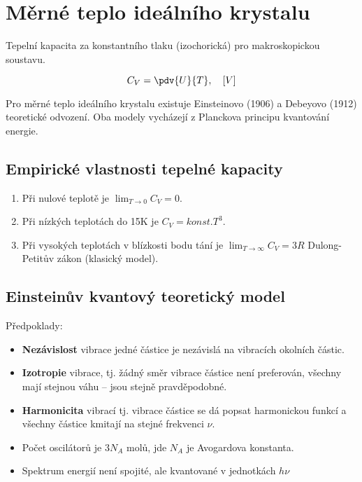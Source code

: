\chapter{Měrné teplo ideálního krystalu}

Tepelní kapacita za konstantního tlaku (izochorická) pro makroskopickou soustavu.

\begin{equation}
    C_V = \pdv{U}{T}, \quad [V]
\end{equation}

Pro měrné teplo ideálního krystalu existuje Einsteinovo (1906) a Debeyovo (1912) teoretické odvození. Oba modely vycházejí z Planckova principu kvantování energie.  

\section{Empirické vlastnosti tepelné kapacity}

\begin{enumerate}
    \item Při nulové teplotě je $\lim_{T \to 0} C_V = 0$.
    \item Při nízkých teplotách do 15K je $C_V = konst. T^3$.
    \item Při vysokých teplotách v blízkosti bodu tání je $ \lim_{T \to \infty} C_V = 3R$ Dulong-Petitův zákon (klasický model).
\end{enumerate}

\section{Einsteinův kvantový teoretický model}

Předpoklady:
\begin{itemize}
    \item \textbf{Nezávislost} vibrace jedné částice je nezávislá na vibracích okolních částic.
    \item \textbf{Izotropie} vibrace, tj. žádný směr vibrace částice není preferován, všechny mají stejnou váhu -- jsou stejně pravděpodobné.
    \item \textbf{Harmonicita} vibrací tj. vibrace částice se dá popsat harmonickou funkcí a všechny částice kmitají na stejné frekvenci $\nu$.
    \item Počet oscilátorů je $3N_A$ molů, jde $N_A$ je Avogardova konstanta.
    \item  Spektrum energií není spojité, ale kvantované v jednotkách $h\nu$ 
\end{itemize}

